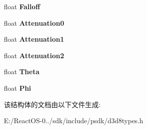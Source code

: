 \begin{DoxyCompactItemize}
float {\bfseries Falloff}
\item 
\mbox{\label{struct___d3_d_l_i_g_h_t8_aa6951740b89d108f55aef4ad1fd0d80d}} 
float {\bfseries Attenuation0}
\item 
\mbox{\label{struct___d3_d_l_i_g_h_t8_a1325760d9829732d418b4e43d677d7f9}} 
float {\bfseries Attenuation1}
\item 
\mbox{\label{struct___d3_d_l_i_g_h_t8_a112f4627fece40f45f237dcdc51863d4}} 
float {\bfseries Attenuation2}
\item 
\mbox{\label{struct___d3_d_l_i_g_h_t8_afe79b9e78856db2d9bf92d5ff066789b}} 
float {\bfseries Theta}
\item 
\mbox{\label{struct___d3_d_l_i_g_h_t8_a31f9fa4e0f91e8601b2666dd1f383fdd}} 
float {\bfseries Phi}
\end{DoxyCompactItemize}


该结构体的文档由以下文件生成\+:\begin{DoxyCompactItemize}
\item 
E\+:/\+React\+O\+S-\/0../sdk/include/psdk/d3d8types.\+h\end{DoxyCompactItemize}
